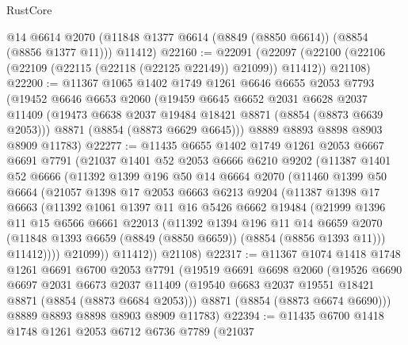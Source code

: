 \begin{lexlean}{RustCore}
\begin{coremodule}
      @14
      @6614
      @2070
      (@11848 @1377 @6614 (@8849 (@8850 @6614)) (@8854 (@8856 @1377 @11)))
      @11412)
@22160 := @22091
    (@22097 (@22100 (@22106 (@22109 (@22115 (@22118 (@22125 @22149)) @21099)) @11412)) @21108)
@22200 := @11367
    @1065
    @1402
    @1749
    @1261
    @6646
    @6655
    @2053
    @7793
    (@19452
      @6646
      @6653
      @2060
      (@19459
        @6645
        @6652
        @2031
        @6628
        @2037
        @11409
        (@19473 @6638 @2037 @19484 @18421 @8871 (@8854 (@8873 @6639 @2053)))
        @8871
        (@8854 (@8873 @6629 @6645)))
      @8889
      @8893
      @8898
      @8903
      @8909
      @11783)
@22277 := @11435
    @6655
    @1402
    @1749
    @1261
    @2053
    @6667
    @6691
    @7791
    (@21037
      @1401
      @52
      @2053
      @6666
      @6210
      @9202
      (@11387
        @1401
        @52
        @6666
        (@11392
          @1399
          @196
          @50
          @14
          @6664
          @2070
          (@11460
            @1399
            @50
            @6664
            (@21057
              @1398
              @17
              @2053
              @6663
              @6213
              @9204
              (@11387
                @1398
                @17
                @6663
                (@11392
                  @1061
                  @1397
                  @11
                  @16
                  @5426
                  @6662
                  @19484
                  (@21999
                    @1396
                    @11
                    @15
                    @6566
                    @6661
                    @22013
                    (@11392
                      @1394
                      @196
                      @11
                      @14
                      @6659
                      @2070
                      (@11848 @1393 @6659 (@8849 (@8850 @6659)) (@8854 (@8856 @1393 @11)))
                      @11412))))
              @21099))
          @11412))
      @21108)
@22317 := @11367
    @1074
    @1418
    @1748
    @1261
    @6691
    @6700
    @2053
    @7791
    (@19519
      @6691
      @6698
      @2060
      (@19526
        @6690
        @6697
        @2031
        @6673
        @2037
        @11409
        (@19540 @6683 @2037 @19551 @18421 @8871 (@8854 (@8873 @6684 @2053)))
        @8871
        (@8854 (@8873 @6674 @6690)))
      @8889
      @8893
      @8898
      @8903
      @8909
      @11783)
@22394 := @11435
    @6700
    @1418
    @1748
    @1261
    @2053
    @6712
    @6736
    @7789
    (@21037

\end{coremodule}
\end{lexlean}
